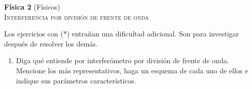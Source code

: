 \documentclass[11pt,spanish,a4paper]{article}
\begin{document}
\begin{center}
	\textbf{Física 2} (Físicos) \hfill {}\\
	\textsc{\LARGE Interferencia por división de frente de onda}
\end{center}

Los ejercicios con (*) entrañan una dificultad adicional. Son para investigar después de resolver los demás.


\begin{enumerate}






\section*{Resumen: interferómetros por división de frente de onda}
\item Diga qué entiende por interferómetro por división de frente de onda.
Mencione los más representativos, haga un esquema de cada uno de ellos e indique sus parámetros característicos.


\end{enumerate}
\end{document}
